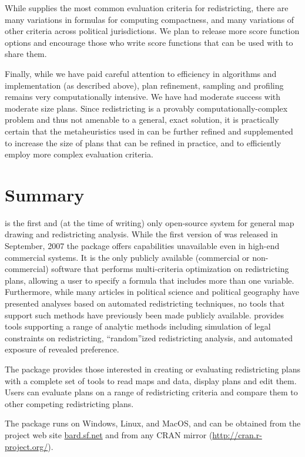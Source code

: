 \documentclass[article]{JSSstyle/jss}
\begin{document}
While  supplies the most common evaluation criteria for redistricting, there are 
many variations in formulas for computing compactness, and many variations of other criteria across political 
jurisdictions. We plan to release more score function options and encourage those who write score 
functions that can be used with  to share them.

Finally, while we have paid careful attention to efficiency in algorithms and 
implementation (as described above), plan refinement, sampling and profiling remains very 
computationally intensive. We have had moderate success with moderate size plans. Since redistricting is a provably computationally-complex problem and thus not 
amenable to a general, exact solution, it is practically certain that the metaheuristics 
used in  can be further refined and supplemented to increase the size of plans that can be refined in practice, and to efficiently employ more complex evaluation criteria.

\section{Summary}

 is the first and (at the time of writing) only open-source system for general map drawing and redistricting analysis. While 
the first version of  was released in September, 2007 the package offers capabilities 
unavailable even in high-end commercial systems.  It is the only publicly available (commercial or non-commercial) 
software that performs multi-criteria optimization on redistricting plans, allowing a user to specify a 
formula that includes more than one variable. Furthermore, while many articles in political science and political geography have 
presented analyses based on automated redistricting techniques, no tools that support such methods have previously been made publicly available.   provides tools 
supporting a range of analytic methods including simulation of legal constraints on redistricting, ``random''ized 
redistricting analysis, and automated exposure of revealed preference. 

The  package provides those interested in creating or evaluating redistricting 
plans with a complete set of tools to read maps and data, display plans and edit them. Users can evaluate plans 
on a range of redistricting criteria and compare them to other competing redistricting plans. 

The  package runs on Windows, Linux, and MacOS, and can be obtained from the project 
web site \url{bard.sf.net} and from any  CRAN mirror (\url{http://cran.r-project.org/}). 
\end{document}
